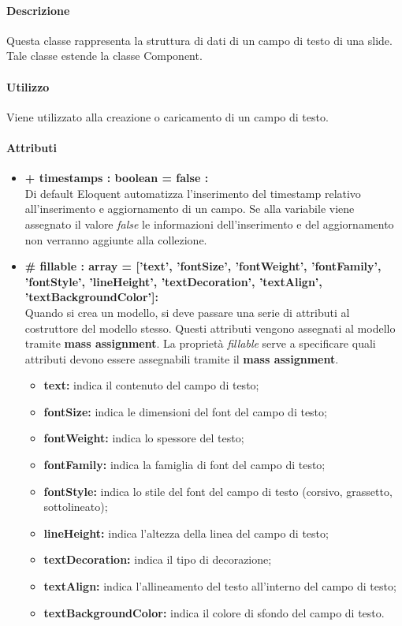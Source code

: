 	\paragraph{Descrizione}
	Questa classe rappresenta la struttura di dati di un campo di testo di una \gls{slide}. Tale classe estende la classe Component.
	
	\paragraph{Utilizzo}
	Viene utilizzato alla creazione o caricamento di un campo di testo.
	
	\paragraph{Attributi}
	\begin{itemize}
		\item \textbf{+ timestamps : boolean = false :}\\
		Di default Eloquent automatizza l'inserimento del timestamp relativo all'inserimento e aggiornamento di un campo. Se alla variabile viene assegnato il valore \textit{false} le informazioni dell'inserimento e del aggiornamento non verranno aggiunte alla collezione.
		\item \textbf{\# fillable : array = [’text’, ’fontSize’, ’fontWeight’, ’fontFamily’, ’fontStyle’, ’lineHeight’, ’textDecoration’, ’textAlign’, ’textBackgroundColor']:}\\
		Quando si crea un modello, si deve passare una serie di attributi al costruttore del modello stesso. Questi attributi vengono assegnati al modello tramite \textbf{mass assignment}. La proprietà \textit{fillable} serve a specificare quali attributi devono essere assegnabili tramite il \textbf{mass assignment}.
		\begin{itemize}
			\item \textbf{text:} indica il contenuto del campo di testo;
			\item \textbf{fontSize:} indica le dimensioni del \gls{font} del campo di testo;
			\item \textbf{fontWeight:} indica lo spessore del testo;
			\item \textbf{fontFamily:} indica la famiglia di \gls{font} del campo di testo;
			\item \textbf{fontStyle:} indica lo stile del \gls{font} del campo di testo (corsivo, grassetto, sottolineato);
			\item \textbf{lineHeight:} indica l'altezza della linea del campo di testo;
			\item \textbf{textDecoration:} indica il tipo di decorazione;
			\item \textbf{textAlign:} indica l'allineamento del testo all'interno del campo di testo;
			\item \textbf{textBackgroundColor:} indica il colore di sfondo del campo di testo.
		\end{itemize}
	\end{itemize}
\newpage


